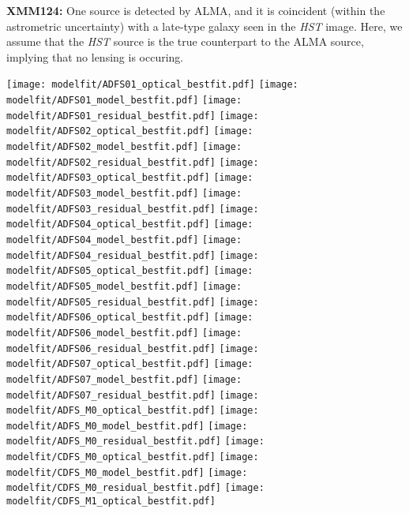 \documentclass[iop]{emulateapj}
\begin{document}
{\bf XMM124:} One source is detected by ALMA, and it is coincident (within the
astrometric uncertainty) with a late-type galaxy seen in the {\it HST} image.
Here, we assume that the {\it HST} source is the true counterpart to the ALMA
source, implying that no lensing is occuring.  

\begin{figure*}[!tbp] 
    \begin{centering}
\texttt{[image: modelfit/ADFS01\_optical\_bestfit.pdf]}
\texttt{[image: modelfit/ADFS01\_model\_bestfit.pdf]}
\texttt{[image: modelfit/ADFS01\_residual\_bestfit.pdf]}
\texttt{[image: modelfit/ADFS02\_optical\_bestfit.pdf]}
\texttt{[image: modelfit/ADFS02\_model\_bestfit.pdf]}
\texttt{[image: modelfit/ADFS02\_residual\_bestfit.pdf]}
\texttt{[image: modelfit/ADFS03\_optical\_bestfit.pdf]}
\texttt{[image: modelfit/ADFS03\_model\_bestfit.pdf]}
\texttt{[image: modelfit/ADFS03\_residual\_bestfit.pdf]}
\texttt{[image: modelfit/ADFS04\_optical\_bestfit.pdf]}
\texttt{[image: modelfit/ADFS04\_model\_bestfit.pdf]}
\texttt{[image: modelfit/ADFS04\_residual\_bestfit.pdf]}
\texttt{[image: modelfit/ADFS05\_optical\_bestfit.pdf]}
\texttt{[image: modelfit/ADFS05\_model\_bestfit.pdf]}
\texttt{[image: modelfit/ADFS05\_residual\_bestfit.pdf]}
\texttt{[image: modelfit/ADFS06\_optical\_bestfit.pdf]}
\texttt{[image: modelfit/ADFS06\_model\_bestfit.pdf]}
\texttt{[image: modelfit/ADFS06\_residual\_bestfit.pdf]}
\texttt{[image: modelfit/ADFS07\_optical\_bestfit.pdf]}
\texttt{[image: modelfit/ADFS07\_model\_bestfit.pdf]}
\texttt{[image: modelfit/ADFS07\_residual\_bestfit.pdf]}
\texttt{[image: modelfit/ADFS\_M0\_optical\_bestfit.pdf]}
\texttt{[image: modelfit/ADFS\_M0\_model\_bestfit.pdf]}
\texttt{[image: modelfit/ADFS\_M0\_residual\_bestfit.pdf]}
\texttt{[image: modelfit/CDFS\_M0\_optical\_bestfit.pdf]}
\texttt{[image: modelfit/CDFS\_M0\_model\_bestfit.pdf]}
\texttt{[image: modelfit/CDFS\_M0\_residual\_bestfit.pdf]}
\texttt{[image: modelfit/CDFS\_M1\_optical\_bestfit.pdf]}

\end{centering}
\end{figure*}
\end{document}
